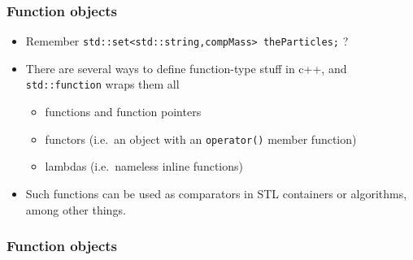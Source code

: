 \subsubsection{Function objects}\label{function-objects}

\begin{itemize}
\itemsep1pt\parskip0pt
\item
  Remember
  \texttt{std::set\textless{}std::string,compMass\textgreater{} theParticles;}
  ?
\item
  There are several ways to define function-type stuff in c++, and
  \texttt{std::function} wraps them all

  \begin{itemize}
  \itemsep1pt\parskip0pt
  \item
    functions and function pointers
  \item
    functors (i.e.~an object with an \texttt{operator()} member
    function)
  \item
    lambdas (i.e.~nameless inline functions)
  \end{itemize}
\item
  Such functions can be used as comparators in STL containers or
  algorithms, among other things.
\end{itemize}

\subsubsection{Function objects}\label{function-objects-1}


